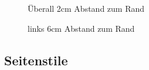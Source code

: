 \begin{frame}[fragile,t]
\begin{minipage}{\textwidth}
\begin{minipage}{.49\textwidth}
\begin{figure}[htp]
\vspace{-5pt}
\caption{Überall 2cm Abstand zum Rand}
\end{figure}
\end{minipage}
\pause
\begin{minipage}{.49\textwidth}
\begin{figure}[htp]
\centering
{}
\vspace{-5pt}
\caption{links 6cm Abstand zum Rand}
\end{figure}
\end{minipage}
\end{minipage}
\end{frame}


\subsection{Seitenstile}


